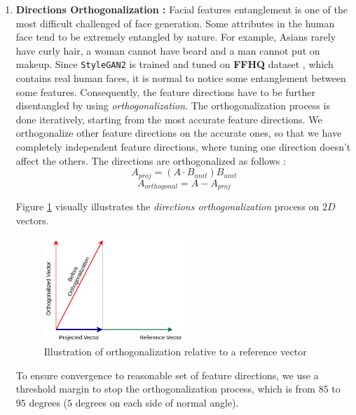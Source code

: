 \begin{enumerate}
    \item \textbf{Directions Orthogonalization :} Facial features entanglement is one of the most difficult challenged of face generation. Some attributes in the human face tend to be extremely entangled by nature. For example, Asians rarely have curly hair, a woman cannot have beard and a man cannot put on makeup. Since \texttt{StyleGAN2} is trained and tuned on \textbf{FFHQ} dataset \cite{karras2019stylebased}, which contains real human faces, it is normal to notice some entanglement between some features. Consequently, the feature directions have to be further disentangled by using \emph{orthogonalization}. The orthogonalization process is done iteratively, starting from the most accurate feature directions. We orthogonalize other feature directions on the accurate ones, so that we have completely independent feature directions, where tuning one direction doesn't affect the others. The directions are orthogonalized as follows :
    \begin{equation}
        A_{proj} = (A \cdot B_{unit}) B_{unit}
    \end{equation}
    \begin{equation}
        A_{orthogonal} = A - A_{proj}
    \end{equation}
    
    Figure \ref{fig:ortho} visually illustrates the \emph{directions orthogonalization} process on $2D$ vectors.
    
    \begin{figure}[H]
        \centering
        \includegraphics[width=0.5\textwidth]{images/orthogonalization.png}
        \caption{Illustration of orthogonalization relative to a reference vector}
        \label{fig:ortho}
    \end{figure}
    
    To ensure convergence to reasonable set of feature directions, we use a threshold margin to stop the orthogonalization process, which is from $85$ to $95$ degrees ($5$ degrees on each side of normal angle).
\end{enumerate}

